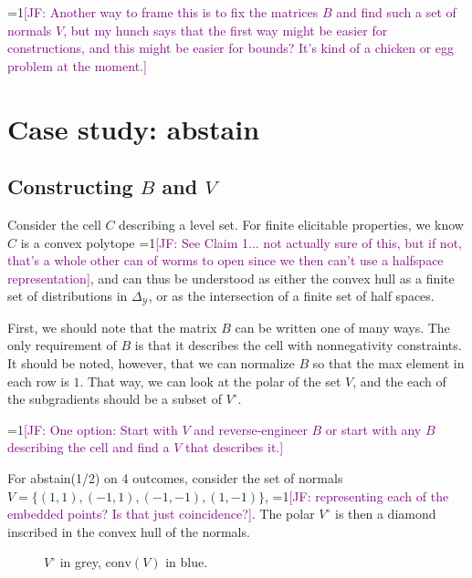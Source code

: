 \documentclass[12pt]{article}
\newcommand{\Comments}{1}
\newcommand{\mynote}[2]{\ifnum\Comments=1\textcolor{#1}{#2}\fi}
\newcommand{\jessie}[1]{\mynote{purple}{[JF: #1]}}
\newcommand{\Y}{\mathcal{Y}}
\newcommand{\conv}{\mathrm{conv}}
\newcommand{\simplex}{\Delta_\Y}
\begin{document}
\jessie{Another way to frame this is to fix the matrices $B$ and find such a set of normals $V$, but my hunch says that the first way might be easier for constructions, and this might be easier for bounds?
It's kind of a chicken or egg problem at the moment.}


\section{Case study: abstain}
\subsection{Constructing $B$ and $V$}
Consider the cell $C$ describing a level set.
For finite elicitable properties, we know $C$ is a convex polytope \jessie{See Claim 1... not actually sure of this, but if not, that's a whole other can of worms to open since we then can't use a halfspace representation}, and can thus be understood as either the convex hull as a finite set of distributions in $\simplex$, or as the intersection of a finite set of half spaces.

First, we should note that the matrix $B$ can be written one of many ways.
The only requirement of $B$ is that it describes the cell with nonnegativity constraints.
It should be noted, however, that we can normalize $B$ so that the max element in each row is $1$.
That way, we can look at the polar of the set $V$, and the each of the subgradients should be a subset of $V^\circ$.

\jessie{One option: Start with $V$ and reverse-engineer $B$ or start with any $B$ describing the cell and find a $V$ that describes it.}

For abstain(1/2) on 4 outcomes, consider the set of normals $V = \{(1,1), (-1,1), (-1,-1), (1,-1)\}$, \jessie{representing each of the embedded points?  Is that just coincidence?}.
The polar $V^\circ$ is then a diamond inscribed in the convex hull of the normals.
\begin{figure}
\begin{center}
\caption{$V^\circ$ in grey, $\conv(V)$ in blue.}
\label{fig:abstain-polar}
\end{center}
\end{figure}
\end{document}
